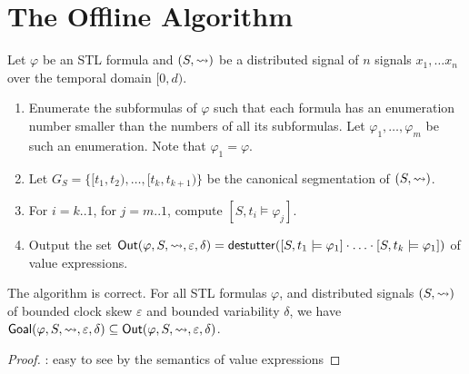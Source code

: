 \section{The Offline Algorithm}

Let $\varphi$ be an STL formula and $(S,{\rightsquigarrow})$ be a distributed signal of $n$ signals $x_1, \ldots x_n$ over the temporal domain $[0,d)$.

\begin{enumerate}
	\item 
	Enumerate the subformulas of $\varphi$ such that each formula has an enumeration number smaller than the numbers of all its subformulas.
	Let $\varphi_1, \ldots, \varphi_m$ be such an enumeration.
	Note that $\varphi_1 = \varphi$.
	
	\item
	Let $G_{S} = \{ [t_1, t_2), \ldots, [t_k, t_{k+1}) \}$ be the canonical segmentation of $(S, {\rightsquigarrow})$.
	
	\item
	For $i = k .. 1$, for $j = m .. 1$, compute $[S, t_i \models \varphi_j]$.
	
	\item
	Output the set $\mathsf{Out}(\varphi, S, {\rightsquigarrow}, \varepsilon, \delta) = \mathsf{destutter}([S,t_1 \models \varphi_1] \cdot \ldots \cdot [S,t_k \models \varphi_1])$ of value expressions. %
\end{enumerate}

\begin{claim}
	The algorithm is correct.
	For all STL formulas $\varphi$, and distributed signals $(S, {\rightsquigarrow})$ of bounded clock skew $\varepsilon$ and bounded variability $\delta$, we have $\mathsf{Goal}(\varphi, S, {\rightsquigarrow}, \varepsilon, \delta) \subseteq \mathsf{Out}(\varphi, S, {\rightsquigarrow}, \varepsilon, \delta)$.
\end{claim}
\begin{proof}
	\TODO: easy to see by the semantics of value expressions
\end{proof}

